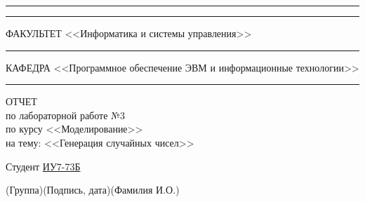 \begin{titlepage}
	\vspace{-2pt}
	\hspace{-34.5pt}\rule{\textwidth}{2.5pt}
	
	\vspace*{-20.3pt}
	\hspace{-34.5pt}\rule{\textwidth}{0.4pt}
	
	\vspace{0.5ex}
	\noindent \small ФАКУЛЬТЕТ\hspace{80pt} <<Информатика и системы управления>>
	
	\vspace*{-16pt}
	\hspace{35pt}\rule{0.855\textwidth}{0.4pt}
	
	\vspace{0.5ex}
	\noindent \small КАФЕДРА\hspace{50pt} <<Программное обеспечение ЭВМ и информационные технологии>>
	
	\vspace*{-16pt}
	\hspace{25pt}\rule{0.875\textwidth}{0.4pt}
	
	
	\vspace{3em}
	
	\begin{center}
		\Large {ОТЧЕТ}\\
		\normalsize по лабораторной работе №3\\
		по курсу <<Моделирование>>\\
		на тему: <<Генерация случайных чисел>>
	\end{center}
	
	\vspace{\fill}
	
	
	\newlength{\ML}
	
	\noindent Студент \underline{\hspace{0.1cm}ИУ7-73Б\hspace{0.1cm}} \hfill \underline{\hspace{4cm}}\quad
	\underline{\hspace{0.4cm}\hspace{0.5cm}}
	
	\vspace{-2.1ex}
	\noindent\hspace{9ex}\scriptsize{(Группа)}\normalsize\hspace{170pt}\hspace{2ex}\scriptsize{(Подпись, дата)}\normalsize\hspace{30pt}\hspace{6ex}\scriptsize{(Фамилия И.О.)}\normalsize
	

\end{titlepage}
